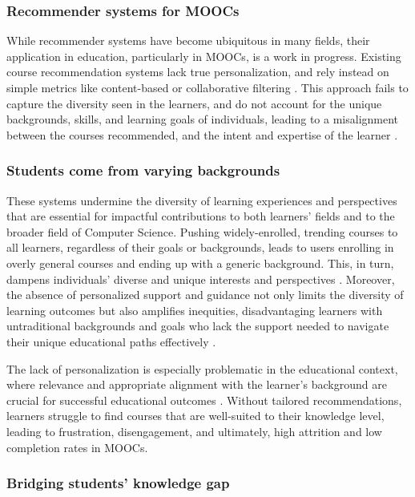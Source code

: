 \subsubsection{Recommender systems for MOOCs} 

While recommender systems have become ubiquitous in many fields, their application in education, particularly in MOOCs, is a work in progress. Existing course recommendation systems lack true personalization, and rely instead on simple metrics like content-based or collaborative filtering \cite{deschenes_recommender_2020} \cite{da_silva_systematic_2023} \cite{khalid_recommender_2020}. This approach fails to capture the diversity seen in the learners, and do not account for the unique backgrounds, skills, and learning goals of individuals, leading to a misalignment between the courses recommended, and the intent and expertise of the learner \cite{noauthor_reinforced_nodate}.

\subsubsection{Students come from varying backgrounds}

These systems undermine the diversity of learning experiences and perspectives that are essential for impactful contributions to both learners' fields and to the broader field of Computer Science. Pushing widely-enrolled, trending courses to all learners, regardless of their goals or backgrounds, leads to users enrolling in overly general courses and ending up with a generic background. This, in turn, dampens individuals’ diverse and unique interests and perspectives \cite{noauthor_2022_nodate}. Moreover, the absence of personalized support and guidance not only limits the diversity of learning outcomes but also amplifies inequities, disadvantaging learners with untraditional backgrounds and goals who lack the support needed to navigate their unique educational paths effectively \cite{dumont_promise_2023}.

The lack of personalization is especially problematic in the educational context, where relevance and appropriate alignment with the learner's background are crucial for successful educational outcomes \cite{noauthor_building_2017}. Without tailored recommendations, learners struggle to find courses that are well-suited to their knowledge level, leading to frustration, disengagement, and ultimately, high attrition and low completion rates in MOOCs.

\subsubsection{Bridging students' knowledge gap}

